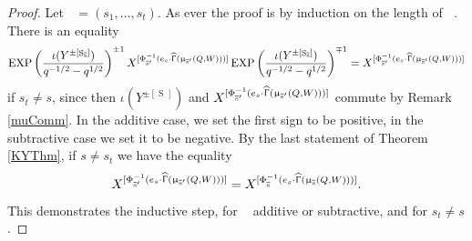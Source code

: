 \documentclass[a4paper,10pt]{amsart}
\DeclareMathOperator{\Simp}{S}
\renewcommand{\Gamma}{\Upgamma}
\renewcommand{\mu}{\upmu}
\DeclareMathOperator{\HGamma}{\widehat{\Gamma}}
\DeclareMathOperator{\EXP}{EXP}
\DeclareMathOperator{\Ss}{\overline{s}}
\newcommand{\pleth}[1]{\EXP\left(#1\right)}
\begin{document}
\begin{proof}
Let $\Ss=(s_1,\ldots,s_t)$.  As ever the proof is by induction on the length of $\Ss$.  There is an equality
\begin{equation}
\label{commDang}
\pleth{\frac{\iota(Y^{\pm[\Simp_{\Ss}]})}{q^{-1/2}-q^{1/2}}}^{\pm 1}X^{[\Phi^{-1}_{\Ss'}(e_s\cdot \HGamma(\mu_{\Ss'}(Q,W)))]}\pleth{\frac{\iota(Y^{\pm[\Simp_{\Ss}]})}{q^{-1/2}-q^{1/2}}}^{\mp 1}=X^{[\Phi^{-1}_{\Ss'}(e_s\cdot \HGamma(\mu_{\Ss'}(Q,W)))]}
\end{equation}
if $s_t\neq s$, since then $\iota(Y^{\pm[\Simp_{\Ss}]})$ and $X^{[\Phi^{-1}_{\Ss'}(e_s\cdot \HGamma(\mu_{\Ss'}(Q,W)))]}$ commute by Remark \ref{muComm}.  In the additive case, we set the first sign to be positive, in the subtractive case we set it to be negative.  By the last statement of Theorem \ref{KYThm}, if $s\neq s_t$ we have the equality
\[
X^{[\Phi^{-1}_{\Ss'}(e_s\cdot \HGamma(\mu_{\Ss'}(Q,W)))]}=X^{[\Phi^{-1}_{\Ss}(e_s\cdot \HGamma(\mu_{\Ss}(Q,W)))]}.
\]
This demonstrates the inductive step, for $\Ss$ additive or subtractive, and for $s_t\neq s$.  


\end{proof}
\end{document}
